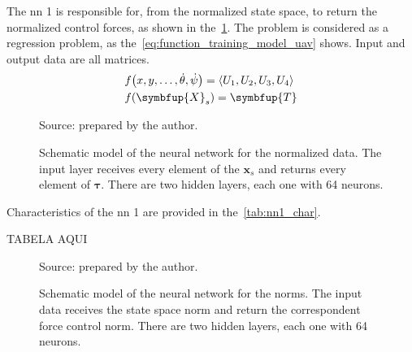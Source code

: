 The \gls*{nn} 1 is responsible for, from the normalized state space, to return the normalized control forces, as shown in the~\cref{fig:nn1_scheme}.
The problem is considered as a regression problem, as the~\cref{eq:function_training_model_uav} shows. Input and output data are all matrices.
%
\begin{subequations}\label{eq:function_training_model_uav}
    \begin{align}
        &f\big(x,y,\ldots,\dot{\theta},\dot{\psi}\big) = \langle U_1, U_2, U_3, U_4 \rangle \\
        &f(\symbfup{X}_s) = \symbfup{T}
    \end{align}
\end{subequations}

\begin{figure}[!htb]
    \centering
    \caption[Schematic model of the neural network for the normalized data]{Schematic model of the neural network for the normalized data. The input layer receives every element of the \(\symbf{x}_s\) and returns every element of \(\symbf{\tau}\). There are two hidden layers, each one with 64 neurons.}
    

    {\footnotesize Source: prepared by the author.}
    \label{fig:nn1_scheme}
\end{figure}

Characteristics of the \gls*{nn} 1 are provided in the~\cref{tab:nn1_char}.

\begin{table}[!htb]
    TABELA AQUI
\end{table}

\begin{figure}[!htb]
    \centering
    \caption[Schematic model of the neural network for the norms]{Schematic model of the neural network for the norms. The input data receives the state space norm and return the correspondent force control norm. There are two hidden layers, each one with 64 neurons.}
    

    {\footnotesize Source: prepared by the author.}
\end{figure}
